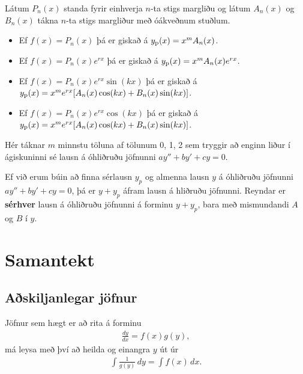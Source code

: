 \documentclass[a4paper,10pt,icelandic]{sphinxmanual}
\begin{document}
Látum \(P_n(x)\) standa fyrir einhverja \(n\)-ta stigs margliðu
og látum \(A_n(x)\) og \(B_n(x)\) tákna \(n\)-ta stigs
margliður með óákveðnum stuðlum.
\begin{itemize}
\item {} 
Ef \(f(x)=P_n(x)\) þá er giskað á \(y_{\rm p}(x)=x^mA_n(x)\).

\item {} 
Ef \(f(x)=P_n(x)e^{rx}\) þá er giskað á
\(y_{\rm p}(x)=x^mA_n(x)e^{rx}\).

\item {} 
Ef \(f(x)=P_n(x)e^{rx}\sin(kx)\) þá er giskað á
\(y_{\rm p}(x)=x^me^{rx}[A_n(x)\cos(kx)+B_n(x)\sin(kx)]\).

\item {} 
Ef \(f(x)=P_n(x)e^{rx}\cos(kx)\) þá er giskað á
\(y_{\rm p}(x)=x^me^{rx}[A_n(x)\cos(kx)+B_n(x)\sin(kx)]\).

\end{itemize}

Hér táknar \(m\) minnstu töluna af tölunum 0, 1, 2 sem tryggir að
enginn liður í ágiskuninni sé lausn á óhliðruðu jöfnunni
\(ay''+by'+cy=0\).

Ef við erum búin að finna sérlausn \(y_p\) og almenna lausn
\(y\) á óhliðruðu jöfnunni \(ay''+by'+cy=0\), þá er
\(y+y_p\) áfram lausn á hliðruðu jöfnunni. Reyndar er \textbf{sérhver}
lausn á óhliðruðu jöfnunni á forminu \(y+y_p\), bara
með mismundandi \(A\) og \(B\) í \(y\).


\section{Samantekt}
\label{kafli08:index-8}\label{kafli08:samantekt}

\subsection{Aðskiljanlegar jöfnur}
\label{kafli08:askiljanlegar-jofnur}
Jöfnur sem hægt er að rita á forminu
\begin{equation*}
\begin{split}\frac{dy}{dx} = f(x)g(y),\end{split}
\end{equation*}
má leysa með því að heilda og einangra \(y\) út úr
\begin{equation*}
\begin{split}\int \frac 1{g(y)}\, dy = \int f(x)\, dx.\end{split}
\end{equation*}
\end{document}
